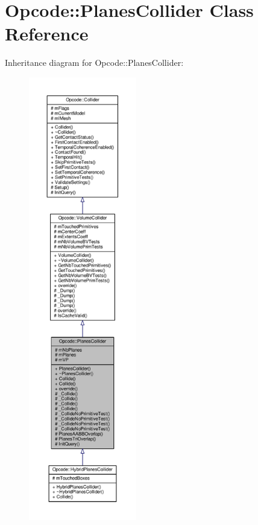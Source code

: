\hypertarget{classOpcode_1_1PlanesCollider}{}\section{Opcode\+:\+:Planes\+Collider Class Reference}
\label{classOpcode_1_1PlanesCollider}


Inheritance diagram for Opcode\+:\+:Planes\+Collider\+:
\nopagebreak
\begin{figure}[H]
\begin{center}
\leavevmode
\includegraphics[height=550pt]{d5/dd3/classOpcode_1_1PlanesCollider__inherit__graph}
\end{center}
\end{figure}


